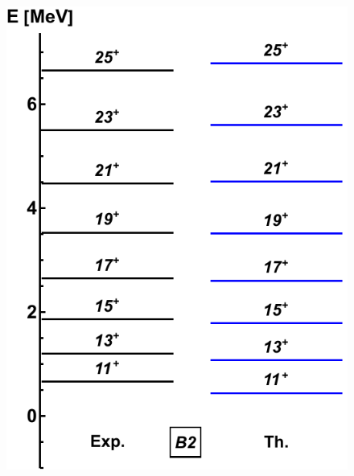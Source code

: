 \documentclass{beamer}
\begin{document}
\begin{frame}
\begin{figure}
  \includegraphics[scale=0.39]{Figs/ba130-band2.pdf}
\end{figure}
\end{frame}
\end{document}
